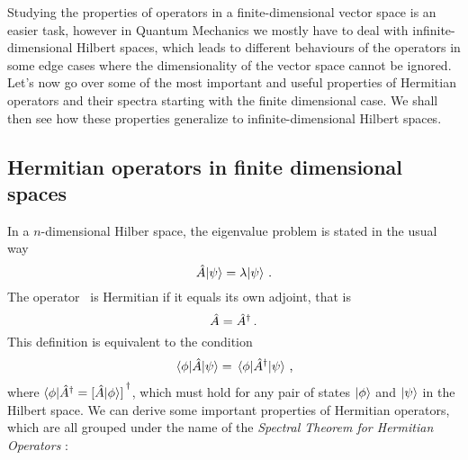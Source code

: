         Studying the properties of operators in a finite-dimensional vector space is an easier task, however in Quantum Mechanics we mostly have to deal with infinite-dimensional Hilbert spaces, which leads to different behaviours of the operators in some edge cases where the dimensionality of the vector space cannot be ignored. Let's now go over some of the most important and useful properties of Hermitian operators and their spectra \cite{Bernardini1993-iy} starting with the finite dimensional case. We shall then see how these properties generalize to infinite-dimensional Hilbert spaces.

        \subsection{Hermitian operators in finite dimensional spaces}
            In a $n$-dimensional Hilber space, the eigenvalue problem is stated in the usual way
            \begin{equation*}
                \hat{A}\! \ket{\psi} = \lambda\! \ket{\psi}
                \,\text{.}
            \end{equation*}
            The operator \hA\ is Hermitian if it equals its own adjoint, that is
            \begin{equation*}
                \hat{A} = \hat{A}^\dagger
                \,\text{.}
            \end{equation*}
            This definition is equivalent to the condition
            \begin{equation}
                \label{eq:hermiticity-inner-product}
                \mel{\phi}{\ensuremath{\hat{A}}}{\psi}
                = \mel{\phi}{\ensuremath{\hat{A}}^\dag}{\psi}
                \,\text{,}
            \end{equation}
            where $\bra{\phi}\!\hA^\dag = \bqty*{\hA\!\ket{\phi}}^\dag$, which must hold for any pair of states $\ket{\phi}$ and $\ket{\psi}$ in the Hilbert space. We can derive some important properties of Hermitian operators, which are all grouped under the name of the \emph{Spectral Theorem for Hermitian Operators} \cite{Bernardini1993-iy}:
